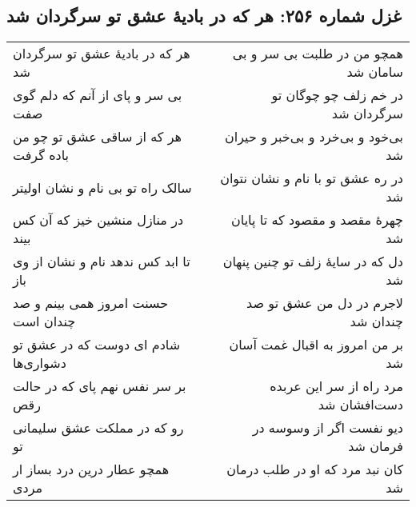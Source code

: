 \begin{center}
\section*{غزل شماره ۲۵۶: هر که در بادیهٔ عشق تو سرگردان شد}
\label{sec:256}
\begin{longtable}{l p{0.5cm} r}
هر که در بادیهٔ عشق تو سرگردان شد
&&
همچو من در طلبت بی سر و بی سامان شد
\\
بی سر و پای از آنم که دلم گوی صفت
&&
در خم زلف چو چوگان تو سرگردان شد
\\
هر که از ساقی عشق تو چو من باده گرفت
&&
بی‌خود و بی‌خرد و بی‌خبر و حیران شد
\\
سالک راه تو بی نام و نشان اولیتر
&&
در ره عشق تو با نام و نشان نتوان شد
\\
در منازل منشین خیز که آن کس بیند
&&
چهرهٔ مقصد و مقصود که تا پایان شد
\\
تا ابد کس ندهد نام و نشان از وی باز
&&
دل که در سایهٔ زلف تو چنین پنهان شد
\\
حسنت امروز همی بینم و صد چندان است
&&
لاجرم در دل من عشق تو صد چندان شد
\\
شادم ای دوست که در عشق تو دشواری‌ها
&&
بر من امروز به اقبال غمت آسان شد
\\
بر سر نفس نهم پای که در حالت رقص
&&
مرد راه از سر این عربده دست‌افشان شد
\\
رو که در مملکت عشق سلیمانی تو
&&
دیو نفست اگر از وسوسه در فرمان شد
\\
همچو عطار درین درد بساز ار مردی
&&
کان نبد مرد که او در طلب درمان شد
\\
\end{longtable}
\end{center}
